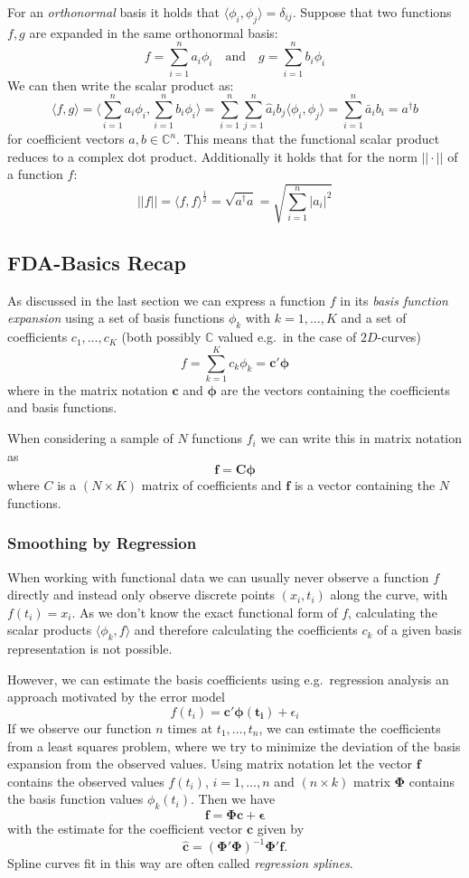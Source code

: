 For an \textit{orthonormal} basis it holds that $\langle \phi_i, \phi_j \rangle = \delta_{ij}$. Suppose that two functions $f,g$ are expanded in the same orthonormal basis:
$$ f = \sum_{i=1}^n a_i \phi_i \quad \text{and} \quad 
  g = \sum_{i=1}^n b_i \phi_i $$
We can then write the scalar product as:
$$ \langle f,g \rangle = 
  \langle \sum_{i=1}^n a_i \phi_i, \sum_{i=1}^n b_i \phi_i \rangle = 
  \sum_{i=1}^n \sum_{j=1}^n \hat{a}_i b_j \langle \phi_i, \phi_j \rangle =
  \sum_{i=1}^n \bar{a}_i b_i = a^\dagger b$$
for coefficient vectors $a, b \in \mathbb{C}^n$. This means that the functional scalar product reduces to a complex dot product. Additionally it holds that for the norm $||\cdot||$ of a function $f$:
$$ ||f|| = \langle f,f \rangle^{\frac{1}{2}} = 
  \sqrt{a^\dagger a} = \sqrt{\sum_{i=1}^n |a_i|^2}$$

\subsection{FDA-Basics Recap}
As discussed in the last section we can express a function $f$ in its \textit{basis function expansion} using a set of basis functions $\phi_k$ with $k=1,\dots,K$ and a set of coefficients $c_1,\dots,c_K$ (both possibly $\mathbb{C}$ valued e.g.\ in the case of $2D$-curves)
$$ f = \sum_{k=1}^K c_k \phi_k = \bm{c'}\bm{\phi} $$
where in the matrix notation $\bm{c}$ and $\bm{\phi}$ are the vectors containing the coefficients and basis functions.

When considering a sample of $N$ functions $f_i$ we can write this in matrix notation as 
$$ \bm{f} = \bm{C}\bm{\phi} $$
where $C$ is a $(N \times K)$ matrix of coefficients and $\bm{f}$ is a vector containing the $N$ functions.

\subsubsection{Smoothing by Regression}
When working with functional data we can usually never observe a function $f$ directly and instead only observe discrete points $(x_i, t_i)$ along the curve, with $f(t_i) = x_i$.
As we don't know the exact functional form of $f$, calculating the scalar products $\langle \phi_k, f \rangle$ and therefore calculating the coefficients $c_k$ of a given basis representation is not possible.

However, we can estimate the basis coefficients using e.g.\ regression analysis an approach motivated by the error model
$$ f(t_i) = \bm{c'}\bm{\phi(t_i)} + \epsilon_i $$
If we observe our function $n$ times at $t_1,\dots,t_n$, we can estimate the coefficients from a least squares problem, where we try to minimize the deviation of the basis expansion from the observed values.
Using matrix notation let the vector $\bm{f}$ contains the observed values $f(t_i)$, $i=1,\dots,n$ and $(n \times k)$ matrix $\bm{\Phi}$ contains the basis function values $\phi_k(t_i)$.
Then we have
$$ \bm{f} = \bm{\Phi}\bm{c} + \bm{\epsilon} $$
with the estimate for the coefficient vector $\bm{c}$ given by
$$ \hat{\bm{c}} = \left( \bm{\Phi'} \bm{\Phi}\right)^{-1} \bm{\Phi'} \bm{f}. $$
Spline curves fit in this way are often called \textit{regression splines}.


